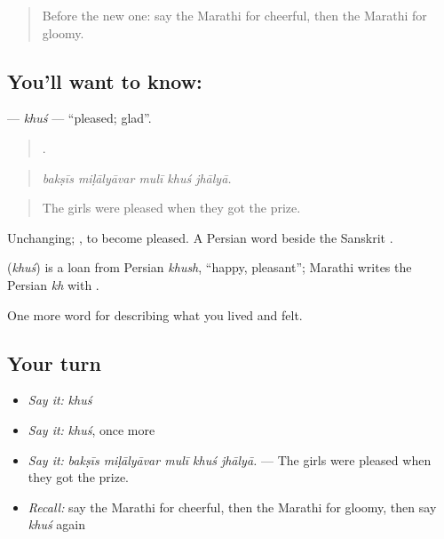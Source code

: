 \label{lesson:MR-C451-khus}



\begin{quote}
Before the new one: say the Marathi for cheerful, then the Marathi for gloomy.
\end{quote}

\subsection*{You'll want to know: }
\textbf{} — \emph{khuś} — \textquotedblleft{}pleased; glad\textquotedblright{}.

\begin{quote}
    .
\end{quote}

\begin{quote}
\emph{bakṣīs miḷālyāvar mulī khuś jhālyā.}
\end{quote}

\begin{quote}
The girls were pleased when they got the prize.
\end{quote}

Unchanging;  , to become pleased. A Persian word beside the Sanskrit .

\begin{cousinweb}
\textbf{} (\emph{khuś}) is a loan from Persian \emph{khush}, \textquotedblleft{}happy, pleasant\textquotedblright{}; Marathi writes the Persian \emph{kh} with .
\end{cousinweb}

\begin{grammarlens}[title={What you've built}]
One more word for describing what you lived and felt.
\end{grammarlens}

\subsection*{Your turn}
\begin{itemize}
\raggedright
  \item \emph{Say it:} \emph{khuś}
  \item \emph{Say it:} \emph{khuś}, once more
  \item \emph{Say it:} \emph{bakṣīs miḷālyāvar mulī khuś jhālyā.} — The girls were pleased when they got the prize.
  \item \emph{Recall:} say the Marathi for cheerful, then the Marathi for gloomy, then say \emph{khuś} again
\end{itemize}

